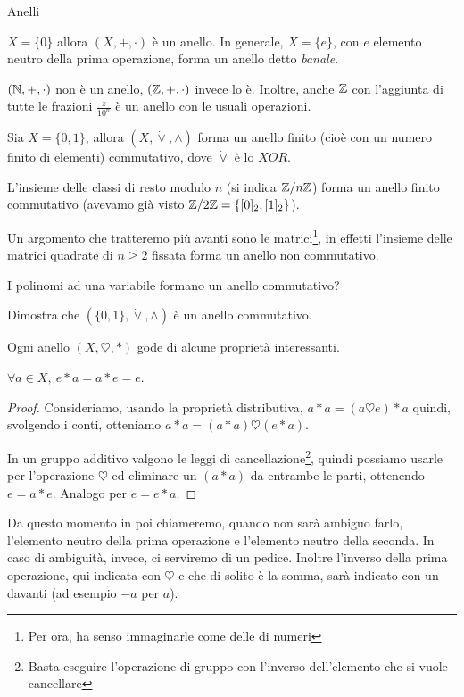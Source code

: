 \begin{subsubsection}{Anelli}
\begin{description}
			\end{description}
			\begin{eg}
				$X=\{0\}$ allora $(X,+,\cdot)$ è un anello. In generale, $X=\{e\}$, con $e$ elemento neutro della prima operazione, forma un anello detto \emph{banale}.
			\end{eg}
			\begin{eg}
				$(\mathbb{N},+,\cdot)$ non è un anello, $(\mathbb{Z},+,\cdot)$ invece lo è. Inoltre, anche $\mathbb{Z}$ con l'aggiunta di tutte le frazioni $\frac{z}{10^n}$ è un anello con le usuali operazioni.
			\end{eg}
			\begin{eg}
				Sia $X=\{0,1\}$, allora $(X,\dot{\lor},\land)$ forma un anello finito (cioè con un numero finito di elementi) commutativo, dove $\dot{\lor}$ è lo $XOR$.
			\end{eg}
			\begin{eg}
				L'insieme delle classi di resto modulo $n$ (si indica $\mathbb{Z}/n\mathbb{Z}$) forma un anello finito commutativo (avevamo già visto $\mathbb{Z}/2\mathbb{Z}=\{[0]_2, [1]_2\}$).
			\end{eg}
			\begin{eg}
				Un argomento che tratteremo più avanti sono le matrici\footnote{Per ora, ha senso immaginarle come delle  di numeri}, in effetti l'insieme delle matrici quadrate di  $n\geq2$ fissata forma un anello non commutativo.
			\end{eg}
			\begin{es}
				I polinomi ad una variabile formano un anello commutativo?
			\end{es}
			\begin{es}
				Dimostra che $(\{0,1\},\dot{\lor},\land)$ è un anello commutativo.
			\end{es}
			Ogni anello $(X,\heartsuit,\ast)$ gode di alcune proprietà interessanti.
			\begin{prop}
				$\forall a\in X,\ e\ast a=a\ast e=e$.
			\end{prop}
			\begin{proof}
				Consideriamo, usando la proprietà distributiva, $a*a=(a\heartsuit e)*a$ quindi, svolgendo i conti, otteniamo $a*a=(a*a) \heartsuit (e*a)$. 
				
				In un gruppo additivo valgono le leggi di cancellazione\footnote{Basta eseguire l'operazione di gruppo con l'inverso dell'elemento che si vuole cancellare}, quindi possiamo usarle per l'operazione $\heartsuit$ ed eliminare un $(a*a)$ da entrambe le parti, ottenendo $e=a*e$. Analogo per $e=e*a$.
			\end{proof}
			Da questo momento in poi chiameremo, quando non sarà ambiguo farlo,  l'elemento neutro della prima operazione e  l'elemento neutro della seconda. In caso di ambiguità, invece, ci serviremo di un pedice. Inoltre l'inverso della prima operazione, qui indicata con $\heartsuit$ e che di solito è la somma, sarà indicato con un \virg{$-$} davanti (ad esempio $-a$ per $a$).
			

\end{subsubsection}
